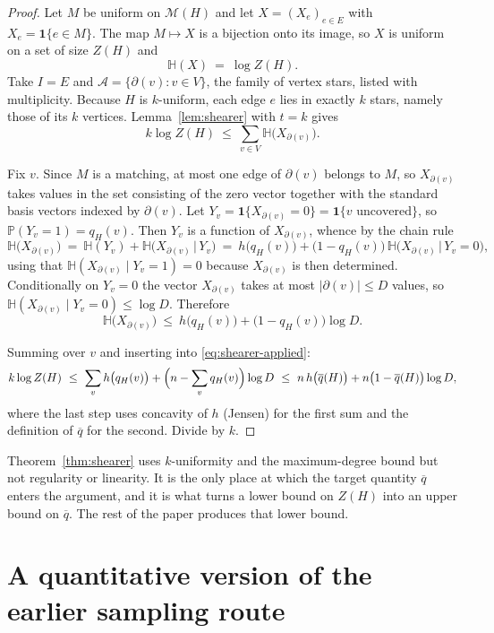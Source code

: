 \documentclass[10pt,a4paper]{amsart}
\newcommand{\VV}{V}
\newcommand{\EE}{E}
\newcommand{\Mat}{\mathcal{M}}
\newcommand{\PP}{\mathbb{P}}
\newcommand{\Ent}{\mathbb{H}}
\newcommand{\qbar}{\overline{q}}
\newcommand{\dg}{\partial}
\begin{document}
\begin{proof}
Let $M$ be uniform on $\Mat(H)$ and let $X=(X_e)_{e\in \EE}$ with
$X_e=\mathbf{1}\{e\in M\}$. The map $M\mapsto X$ is a bijection onto its image, so $X$ is
uniform on a set of size $Z(H)$ and
\[
  \Ent(X)\ =\ \log Z(H).
\]
Take $I=\EE$ and $\mathcal{A}=\{\dg(v):v\in \VV\}$, the family of vertex stars, listed
with multiplicity. Because $H$ is $k$-uniform, each edge $e$ lies in exactly $k$ stars,
namely those of its $k$ vertices. Lemma~\ref{lem:shearer} with $t=k$ gives
\begin{equation}
\label{eq:shearer-applied}
  k\log Z(H)\ \le\ \sum_{v\in \VV}\Ent\bigl(X_{\dg(v)}\bigr).
\end{equation}

Fix $v$. Since $M$ is a matching, at most one edge of $\dg(v)$ belongs to $M$, so
$X_{\dg(v)}$ takes values in the set consisting of the zero vector together with the
standard basis vectors indexed by $\dg(v)$. Let
$Y_v=\mathbf{1}\{X_{\dg(v)}=0\}=\mathbf{1}\{v\text{ uncovered}\}$, so
$\PP(Y_v=1)=q_H(v)$. Then $Y_v$ is a function of $X_{\dg(v)}$, whence by the chain rule
\[
  \Ent\bigl(X_{\dg(v)}\bigr)
  \ =\ \Ent(Y_v)+\Ent\bigl(X_{\dg(v)}\,\big|\,Y_v\bigr)
  \ =\ h\bigl(q_H(v)\bigr)+\bigl(1-q_H(v)\bigr)\,
        \Ent\bigl(X_{\dg(v)}\,\big|\,Y_v=0\bigr),
\]
using that $\Ent(X_{\dg(v)}\mid Y_v=1)=0$ because $X_{\dg(v)}$ is then determined.
Conditionally on $Y_v=0$ the vector $X_{\dg(v)}$ takes at most $|\dg(v)|\le D$ values, so
$\Ent(X_{\dg(v)}\mid Y_v=0)\le\log D$. Therefore
\[
  \Ent\bigl(X_{\dg(v)}\bigr)\ \le\ h\bigl(q_H(v)\bigr)+\bigl(1-q_H(v)\bigr)\log D .
\]

Summing over $v$ and inserting into \eqref{eq:shearer-applied}:
\[
  k\log Z(H)\ \le\ \sum_{v}h\bigl(q_H(v)\bigr)+\Bigl(n-\sum_v q_H(v)\Bigr)\log D
  \ \le\ n\,h\bigl(\qbar(H)\bigr)+n\bigl(1-\qbar(H)\bigr)\log D ,
\]
where the last step uses concavity of $h$ (Jensen) for the first sum and the definition of
$\qbar$ for the second. Divide by $k$.
\end{proof}

Theorem~\ref{thm:shearer} uses $k$-uniformity and the maximum-degree bound but not
regularity or linearity. It is
the only place at which the target quantity $\qbar$ enters the argument, and it is what
turns a lower bound on $Z(H)$ into an upper bound on $\qbar$. The rest of the paper
produces that lower bound.

\section{A quantitative version of the earlier sampling route}
\label{sec:nibble}
\end{document}
